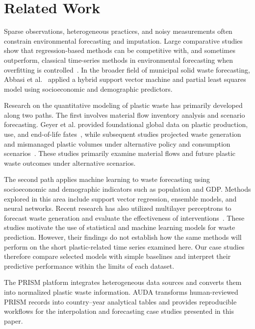 \section{Related Work}

Sparse observations, heterogeneous practices, and noisy measurements often constrain environmental forecasting and imputation.
Large comparative studies show that regression-based methods can be competitive with, and sometimes outperform, classical time-series methods in environmental forecasting when overfitting is controlled~\cite{effrosynidis2023time}.
In the broader field of municipal solid waste forecasting, Abbasi et al.~\cite{abbasi2013forecasting} applied a hybrid support vector machine and partial least squares model using socioeconomic and demographic predictors.

Research on the quantitative modeling of plastic waste has primarily developed along two paths.
The first involves material flow inventory analysis and scenario forecasting.
Geyer et al. provided foundational global data on plastic production, use, and end-of-life fates~\cite{geyer2017production}, while subsequent studies projected waste generation and mismanaged plastic volumes under alternative policy and consumption scenarios~\cite{borrelle2020predicted,lau2020evaluating,dokl2024global,pottinger2024pathways}.
These studies primarily examine material flows and future plastic waste outcomes under alternative scenarios.

The second path applies machine learning to waste forecasting using socioeconomic and demographic indicators such as population and GDP.
Methods explored in this area include support vector regression, ensemble models, and neural networks.
Recent research has also utilized multilayer perceptrons to forecast waste generation and evaluate the effectiveness of interventions~\cite{fan2022forecasting}.
These studies motivate the use of statistical and machine learning models for waste prediction.
However, their findings do not establish how the same methods will perform on the short plastic-related time series examined here.
Our case studies therefore compare selected models with simple baselines and interpret their predictive performance within the limits of each dataset.

The PRISM platform integrates heterogeneous data sources and converts them into normalized plastic waste information.
AUDA transforms human-reviewed PRISM records into country–year analytical tables and provides reproducible workflows for the interpolation and forecasting case studies presented in this paper.

